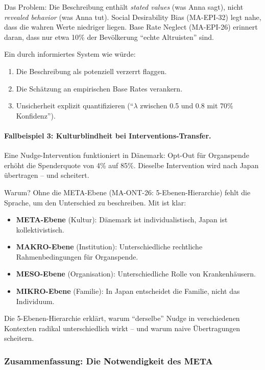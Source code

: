 Das Problem: Die Beschreibung enthält \textit{stated values} (was Anna sagt), nicht \textit{revealed behavior} (was Anna tut). Social Desirability Bias (MA-EPI-32) legt nahe, dass die wahren Werte niedriger liegen. Base Rate Neglect (MA-EPI-26) erinnert daran, dass nur etwa 10\% der Bevölkerung ``echte Altruisten'' sind.

Ein durch \META{} informiertes System wie \BEATRIX{} würde:
\begin{enumerate}
    \item Die Beschreibung als potenziell verzerrt flaggen.
    \item Die Schätzung an empirischen Base Rates verankern.
    \item Unsicherheit explizit quantifizieren (``$\lambda$ zwischen 0.5 und 0.8 mit 70\% Konfidenz'').
\end{enumerate}

\paragraph{Fallbeispiel 3: Kulturblindheit bei Interventions-Transfer.}

Eine Nudge-Intervention funktioniert in Dänemark: Opt-Out für Organspende erhöht die Spenderquote von 4\% auf 85\%. Dieselbe Intervention wird nach Japan übertragen -- und scheitert.

Warum? Ohne die META-Ebene (MA-ONT-26: 5-Ebenen-Hierarchie) fehlt die Sprache, um den Unterschied zu beschreiben. Mit \META{} ist klar:
\begin{itemize}
    \item \textbf{META-Ebene} (Kultur): Dänemark ist individualistisch, Japan ist kollektivistisch.
    \item \textbf{MAKRO-Ebene} (Institution): Unterschiedliche rechtliche Rahmenbedingungen für Organspende.
    \item \textbf{MESO-Ebene} (Organisation): Unterschiedliche Rolle von Krankenhäusern.
    \item \textbf{MIKRO-Ebene} (Familie): In Japan entscheidet die Familie, nicht das Individuum.
\end{itemize}

Die 5-Ebenen-Hierarchie erklärt, warum ``derselbe'' Nudge in verschiedenen Kontexten radikal unterschiedlich wirkt -- und warum naive Übertragungen scheitern.

\subsubsection{Zusammenfassung: Die Notwendigkeit des META}

